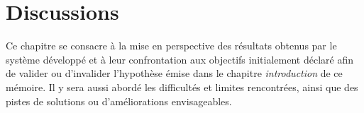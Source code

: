 \chapter{Discussions}
Ce chapitre se consacre à la mise en perspective des résultats obtenus par le système développé et à leur confrontation aux objectifs initialement déclaré afin de valider ou d'invalider l'hypothèse émise dans le chapitre \textit{introduction} de ce mémoire. Il y sera aussi abordé les difficultés et limites rencontrées, ainsi que des pistes de solutions ou d'améliorations envisageables.